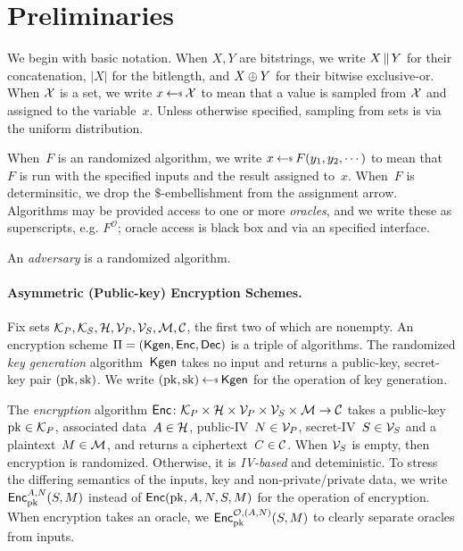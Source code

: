 \section{Preliminaries}
\label{sec:prelims}
We begin with basic notation.  When $X,Y$ are bitstrings, we write $X \concat Y$ for their concatenation, $|X|$ for the bitlength, and $X\xor Y$ for their bitwise exclusive-or.  When $\calX$ is a set, we write $x \getsr \calX$ to mean that a value is sampled from $\calX$ and assigned to the variable~$x$.  Unless otherwise specified, sampling from sets is via the uniform distribution.

When~$F$ is an randomized algorithm, we write $x \getsr F(y_1,y_2,\cdots)$ to mean that~$F$ is run with the specified inputs and the result assigned to~$x$.  When~$F$ is determinsitic, we drop the $\$$-embellishment from the assignment arrow.  Algorithms may be provided access to one or more \emph{oracles}, and we write these as superscripts, e.g. $F^{\mathcal{O}}$; oracle access is black box and via an specified interface.  

An \emph{adversary} is a randomized algorithm.

\paragraph{Asymmetric (Public-key) Encryption Schemes. }
Fix sets $\pubkeys, \seckeys, \adata, \pubivs, \secivs, \ptxts, \ctxts$, the first two of which are nonempty.  An encryption scheme $\Pi=(\Kgen,\Enc,\Dec)$ is a triple of algorithms.  The randomized \emph{key generation} algorithm~$\Kgen$ takes no input and returns a public-key, secret-key pair $(\pk,\sk)$.  We write $(\pk,\sk)\getsr\Kgen$ for the operation of key generation.

The \emph{encryption} algorithm $\Enc \colon \pubkeys \times \adata \times \pubivs \times \secivs \times \ptxts \to \ctxts$ takes a public-key~$\pk\in\pubkeys$, associated data~$\header \in \adata$, public-IV~$\pubiv \in \pubivs$, secret-IV~$\seciv \in \secivs$ and a plaintext~$M \in \ptxts$, and returns a ciphertext~$C \in \ctxts$. 
When $\secivs$ is empty, then encryption is randomized.  Otherwise, it is \emph{IV-based} and deteministic.
To stress the differing semantics of the inputs, key and non-private/private data, we write $\Encprim{\pk}{\header,\pubiv}{S,M}$ instead of $\Enc(\pk,\header,\pubiv,\seciv,M)$ for the operation of encryption.  When encryption takes an oracle, we $\EncprimO{\pk}{\header,\pubiv}{\seciv,M}{\mathcal{O}}$ to clearly separate oracles from inputs.

